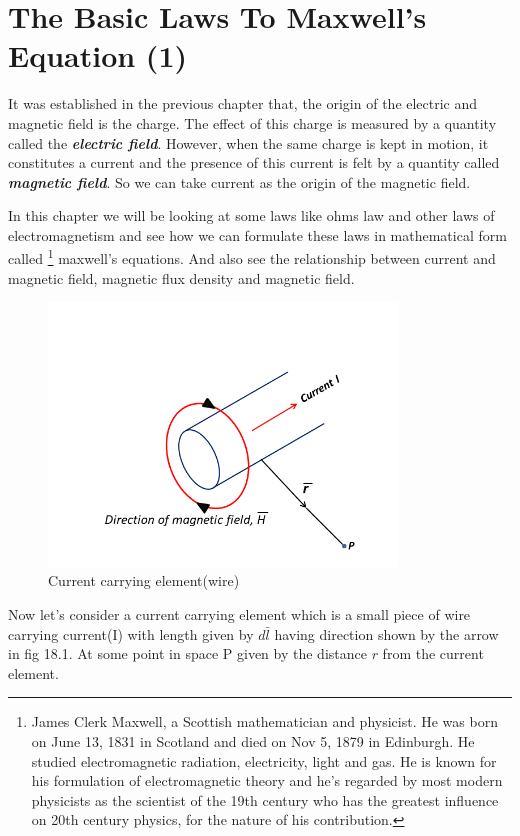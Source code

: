 \chapter{The Basic Laws To Maxwell's Equation (1)}\label{lec:lec18}
It was established in the previous chapter that, the origin of the electric and magnetic field is the charge. The effect of this charge is measured by a quantity called the \textbf{\emph{electric field}}. However, when the same charge is kept in motion, it constitutes a current and the presence of this current is felt by a quantity called \textbf{\emph{magnetic field}}. So we can take current as the origin of the magnetic field. 

In this chapter we will be looking at some laws like ohms law and other laws of electromagnetism and see how we can formulate these laws in mathematical form called \footnote[1]{James Clerk Maxwell, a Scottish mathematician and physicist. He was born on June 13, 1831 in Scotland and died on Nov 5, 1879 in Edinburgh. He studied electromagnetic radiation, electricity, light and gas. He is known for his formulation of electromagnetic theory and he's regarded by most modern physicists as the scientist of the 19th century who has the greatest influence on 20th century physics, for the nature of his contribution.} maxwell's equations. And also see the relationship between current and magnetic field, magnetic flux density and magnetic field.
\begin{figure}[h]
\centering
\includegraphics[height=7cm]{./graphics/currentElement}
\caption{Current carrying element(wire)}
\label{}
\end{figure}

Now let's consider a current carrying element which is a small piece of wire carrying current(I) with length given by $d\bar{l}$ having direction shown by the arrow in fig 18.1. At some point in space P given by the  distance $r$ from the current element.


